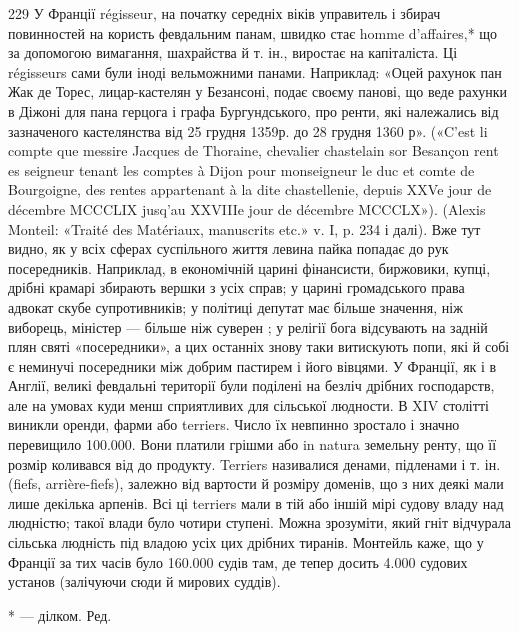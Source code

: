 229    У Франції régisseur, на початку середніх віків управитель і збирач
повинностей на користь февдальним панам, швидко стає homme
d’affaires,* що за допомогою вимагання, шахрайства й т. ін., виростає
на капіталіста. Ці régisseurs сами були іноді вельможними панами. Наприклад:
«Оцей рахунок пан Жак де Торес, лицар-кастелян у
Безансоні, подає своєму панові, що веде рахунки в Діжоні для пана
герцога і графа Бургундського, про ренти, які належались від зазначеного
кастелянства від 25 грудня 1359р. до 28 грудня 1360 р». («C’est
li compte que messire Jacques de Thoraine, chevalier chastelain sor Besançon
rent es seigneur tenant les comptes à Dijon pour monseigneur le
duc et comte de Bourgoigne, des rentes appartenant à la dite chastellenie,
depuis XXVe jour de décembre MCCCLIX jusq’au XXVIIIe jour de décembre
MCCCLX»). (Alexis Monteil: «Traité des Matériaux, manuscrits etc.» v. I,
p. 234 і далі). Вже тут видно, як у всіх сферах суспільного життя левина
пайка попадає до рук посередників. Наприклад, в економічній царині фінансисти,
биржовики, купці, дрібні крамарі збирають вершки з усіх справ;
у царині громадського права адвокат скубе супротивників; у політиці
депутат має більше значення, ніж виборець, міністер — більше ніж суверен
; у релігії бога відсувають на задній плян святі «посередники», а цих
останніх знову таки витискують попи, які й собі є неминучі посередники
між добрим пастирем і його вівцями. У Франції, як і в Англії, великі
февдальні території були поділені на безліч дрібних господарств, але
на умовах куди менш сприятливих для сільської людности. В XIV столітті
виникли оренди, фарми або terriers. Число їх невпинно зростало і
значно перевищило 100.000. Вони платили грішми або in natura земельну
ренту, що її розмір коливався від  до  продукту. Terriers називалися
денами, підленами і т. ін. (fiefs, arrière-fiefs), залежно від вартости й
розміру доменів, що з них деякі мали лише декілька арпенів. Всі ці
terriers мали в тій або іншій мірі судову владу над людністю; такої влади
було чотири ступені. Можна зрозуміти, який гніт відчурала сільська
людність під владою усіх цих дрібних тиранів. Монтейль каже, що у Франції
за тих часів було 160.000 судів там, де тепер досить 4.000 судових установ
(залічуючи сюди й мирових суддів).

* — ділком. Ред.
